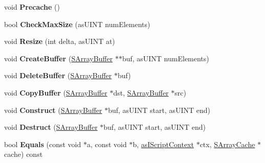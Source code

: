 \begin{DoxyCompactItemize}
\mbox{\label{class_c_script_array_aad3ec13ab9a83bcec2238b0f5e0da49e}} 
void {\bfseries Precache} ()
\item 
\mbox{\label{class_c_script_array_a7b0f5d403c859b4b3d3af2c6eb1f468c}} 
bool {\bfseries Check\+Max\+Size} (as\+U\+I\+NT num\+Elements)
\item 
\mbox{\label{class_c_script_array_ae8a62ceca782c341f7a6786c578d3353}} 
void {\bfseries Resize} (int delta, as\+U\+I\+NT at)
\item 
\mbox{\label{class_c_script_array_a4ed53d161ece72db045d1dee83e2957e}} 
void {\bfseries Create\+Buffer} (\hyperlink{struct_s_array_buffer}{S\+Array\+Buffer} $\ast$$\ast$buf, as\+U\+I\+NT num\+Elements)
\item 
\mbox{\label{class_c_script_array_a7dfbb455d13c71170d86b85ac947c2c8}} 
void {\bfseries Delete\+Buffer} (\hyperlink{struct_s_array_buffer}{S\+Array\+Buffer} $\ast$buf)
\item 
\mbox{\label{class_c_script_array_a4b9de4ef151094e8d9c3879e28cbbf73}} 
void {\bfseries Copy\+Buffer} (\hyperlink{struct_s_array_buffer}{S\+Array\+Buffer} $\ast$dst, \hyperlink{struct_s_array_buffer}{S\+Array\+Buffer} $\ast$src)
\item 
\mbox{\label{class_c_script_array_a2d7d226b6df50e0e5b77aef8bb85e205}} 
void {\bfseries Construct} (\hyperlink{struct_s_array_buffer}{S\+Array\+Buffer} $\ast$buf, as\+U\+I\+NT start, as\+U\+I\+NT end)
\item 
\mbox{\label{class_c_script_array_a12549b933e3a8aadb678bf282b31e94b}} 
void {\bfseries Destruct} (\hyperlink{struct_s_array_buffer}{S\+Array\+Buffer} $\ast$buf, as\+U\+I\+NT start, as\+U\+I\+NT end)
\item 
\mbox{\label{class_c_script_array_a36125c507bc5a1576765b763fdc76d04}} 
bool {\bfseries Equals} (const void $\ast$a, const void $\ast$b, \hyperlink{classas_i_script_context}{as\+I\+Script\+Context} $\ast$ctx, \hyperlink{struct_s_array_cache}{S\+Array\+Cache} $\ast$cache) const
\end{DoxyCompactItemize}
